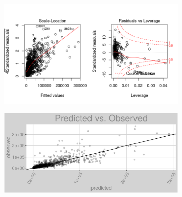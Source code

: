 \begin{figure}[h]
\centering
\begin{subfigure}{1\textwidth}
\centering
\includegraphics[width=.99\textwidth, height=0.475\textheight]{Images/electricity_pls_res_2.png}
\end{subfigure}
\begin{subfigure}{1\textwidth}
\centering
\includegraphics[width=.99\textwidth, height=0.3\textheight]{Images/electricity_pls_pvo.png}
\end{subfigure}
\end{figure}
\newpage
